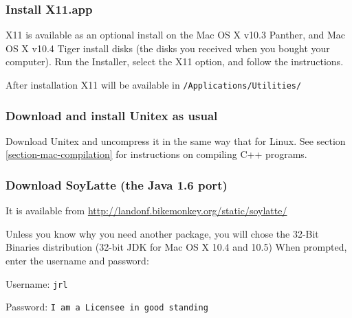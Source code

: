 \subsubsection{Install X11.app}
\noindent X11 is available as an optional install on the Mac OS X v10.3 
Panther, and Mac OS X v10.4 Tiger install disks (the disks you received 
when you bought your computer). Run the Installer, 
select the X11 option, and follow the instructions.

\bigskip
\noindent After installation X11 will be available in
\verb+/Applications/Utilities/+


\subsubsection{Download and install Unitex as usual}
\noindent Download Unitex and uncompress it in the same way that for Linux.
See section \ref{section-mac-compilation} for instructions on compiling
C++ programs.


\subsubsection{Download SoyLatte (the Java 1.6 port)} 
\noindent It is available from
\url{http://landonf.bikemonkey.org/static/soylatte/} 

\bigskip
\noindent Unless you know why you need another package, you will chose 
the 32-Bit Binaries distribution (32-bit JDK for Mac OS X 10.4 and 10.5) 
When prompted, enter the username and password: 

\bigskip
Username: \verb+jrl+

Password: \verb+I am a Licensee in good standing+


